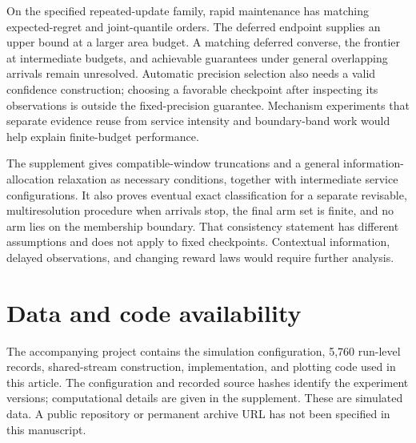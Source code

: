 \documentclass[11pt]{article}
\begin{document}
On the specified repeated-update family, rapid maintenance has matching
expected-regret and joint-quantile orders. The deferred endpoint supplies
an upper bound at a larger area budget. A matching deferred converse,
the frontier at intermediate budgets, and achievable guarantees under
general overlapping arrivals remain unresolved. Automatic precision
selection also needs a valid confidence construction; choosing a
favorable checkpoint after inspecting its observations is outside the
fixed-precision guarantee. Mechanism experiments that separate evidence
reuse from service intensity and boundary-band work would help explain
finite-budget performance.

The supplement gives compatible-window truncations and a general
information-allocation relaxation as necessary conditions, together with
intermediate service configurations. It also proves eventual exact
classification for a separate revisable, multiresolution procedure when
arrivals stop, the final arm set is finite, and no arm lies on the
membership boundary. That consistency statement has different
assumptions and does not apply to fixed checkpoints. Contextual
information, delayed observations, and changing reward laws would require
further analysis.

\section*{Data and code availability}
The accompanying project contains the simulation configuration, 5,760
run-level records, shared-stream construction, implementation, and
plotting code used in this article. The configuration and recorded source
hashes identify the experiment versions; computational details are given
in the supplement. These are simulated data. A public repository or
permanent archive URL has not been specified in this manuscript.



\end{document}
